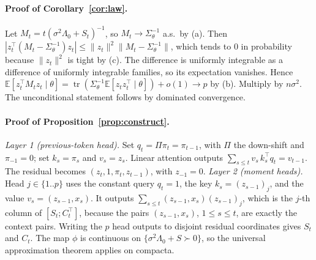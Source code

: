 \paragraph{Proof of Corollary~\ref{cor:law}.}
Let $M_t=t(\sigma^2\Lambda_0+S_t)^{-1}$, so $M_t\to\Sigma_\theta^{-1}$ a.s.\ by (a). Then
$|z_t^\top(M_t-\Sigma_\theta^{-1})z_t|\le\|z_t\|^2\|M_t-\Sigma_\theta^{-1}\|$, which tends to $0$ in probability because $\|z_t\|^2$ is tight by (c). The difference
is uniformly integrable as a difference of uniformly integrable families, so its expectation vanishes. Hence
$\mathbb{E}[z_t^\top M_tz_t\mid\theta]=\operatorname{tr}(\Sigma_\theta^{-1}\mathbb{E}[z_tz_t^\top\mid\theta])+o(1)\to p$ by (b).
Multiply by $n\sigma^2$. The unconditional statement follows by dominated convergence.

\paragraph{Proof of Proposition~\ref{prop:construct}.}
\emph{Layer 1 (previous-token head).} Set $q_t=\Pi\pi_t=\pi_{t-1}$, with $\Pi$ the down-shift and $\pi_{-1}=0$; set $k_s=\pi_s$ and
$v_s=z_s$. Linear attention outputs
$\sum_{s\le t}v_s\,k_s^\top q_t=v_{t-1}$. The residual becomes $(z_t,1,\pi_t,z_{t-1})$, with $z_{-1}=0$.
\emph{Layer 2 (moment heads).} Head $j\in\{1..p\}$ uses the constant query $q_t=1$, the key
$k_s=(z_{s-1})_j$, and the value $v_s=(z_{s-1},x_s)$. It outputs $\sum_{s\le t}(z_{s-1},x_s)(z_{s-1})_j$, which is the
$j$-th column of $[S_t;C_t^\top]$, because the pairs $(z_{s-1},x_s)$, $1\le s\le t$, are exactly the context pairs. Writing
the $p$ head outputs to disjoint residual coordinates gives $S_t$ and $C_t$. The map $\phi$ is continuous on
$\{\sigma^2\Lambda_0+S\succ0\}$, so the universal approximation theorem applies on compacta.

